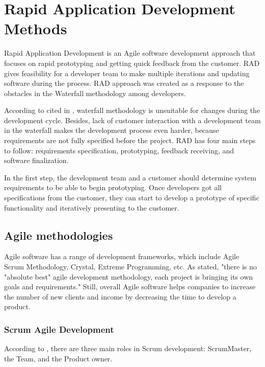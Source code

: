 \documentclass[a4paper]{article}
\begin{document}
   \newpage

    
\section{Rapid Application Development Methods}
     
     \label{rapidApplicationDevMethods}
     Rapid Application Development is an Agile software development approach that focuses on rapid prototyping and getting quick feedback from the customer. RAD gives feasibility for a developer team to make multiple iterations and updating software during the process. RAD approach was created as a response to the obstacles in the Waterfall methodology among developers. 
     
     According to \cite{degrace1990wicked} cited in \cite{sutherland2004agile}, waterfall methodology is unsuitable for changes during the development cycle. Besides, lack of customer interaction with a development team in the waterfall makes the development process even harder, because requirements are not fully specified before the project. RAD has four main steps to follow: requirements specification, prototyping, feedback receiving, and software finalization. 
    
    In the first step, the development team and a customer should determine system requirements to be able to begin prototyping. Once developers got all specifications from the customer, they can start to develop a prototype of specific functionality and iteratively presenting to the customer. \\
  
    \subsection{Agile methodologies}
    Agile software has a range of development frameworks, which include Agile Scrum Methodology, Crystal, Extreme Programming, etc. As \cite{stoica2016analyzing} stated, "there is no "absolute best" agile development methodology, each project is bringing its own goals and requirements." Still, overall Agile software helps companies to increase the number of new clients and income by decreasing the time to develop a product.
    \subsubsection{Scrum Agile Development}
    According to \cite{schwaber2004agile}, there are three main roles in Scrum development: ScrumMaster, the Team, and the Product owner. 
    
\end{document}

